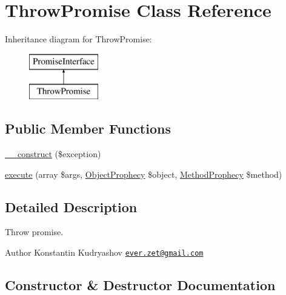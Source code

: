 \hypertarget{class_prophecy_1_1_promise_1_1_throw_promise}{}\section{Throw\+Promise Class Reference}
\label{class_prophecy_1_1_promise_1_1_throw_promise}
Inheritance diagram for Throw\+Promise\+:\begin{figure}[H]
\begin{center}
\leavevmode
\includegraphics[height=2.000000cm]{class_prophecy_1_1_promise_1_1_throw_promise}
\end{center}
\end{figure}
\subsection*{Public Member Functions}
\begin{DoxyCompactItemize}
\item 
\mbox{\hyperlink{class_prophecy_1_1_promise_1_1_throw_promise_a62d6fa9ad1594191d3535672297352ad}{\+\_\+\+\_\+construct}} (\$exception)
\item 
\mbox{\hyperlink{class_prophecy_1_1_promise_1_1_throw_promise_a2b8542872672f9ac4ed0c942f931f0c6}{execute}} (array \$args, \mbox{\hyperlink{class_prophecy_1_1_prophecy_1_1_object_prophecy}{Object\+Prophecy}} \$object, \mbox{\hyperlink{class_prophecy_1_1_prophecy_1_1_method_prophecy}{Method\+Prophecy}} \$method)
\end{DoxyCompactItemize}


\subsection{Detailed Description}
Throw promise.

\begin{DoxyAuthor}{Author}
Konstantin Kudryashov \href{mailto:ever.zet@gmail.com}{\tt ever.\+zet@gmail.\+com} 
\end{DoxyAuthor}


\subsection{Constructor \& Destructor Documentation}
\mbox{\label{class_prophecy_1_1_promise_1_1_throw_promise_a62d6fa9ad1594191d3535672297352ad}} 
